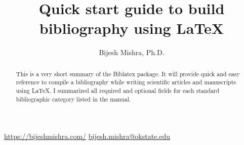 \documentclass{article}
\title{Quick start guide to build bibliography using \LaTeX}
\author{Bijesh Mishra, Ph.D.}
\begin{document}
\maketitle
\begin{center}
 \href{https://bijeshmishra.com/}{https://bijeshmishra.com/}
\hspace{2cm} 
 \href{mailto:bijesh.mishra@okstate.edu}
{bijesh.mishra@okstate.edu}
\end{center}

\begin{abstract}
This is a very short summary of the Biblatex package. It will provide quick and easy reference to compile a bibliography while writing scientific articles and manuscripts using \LaTeX. I summarized all required and optional fields for each standard bibliographic category listed in the manual.
\end{abstract}
\end{document}

